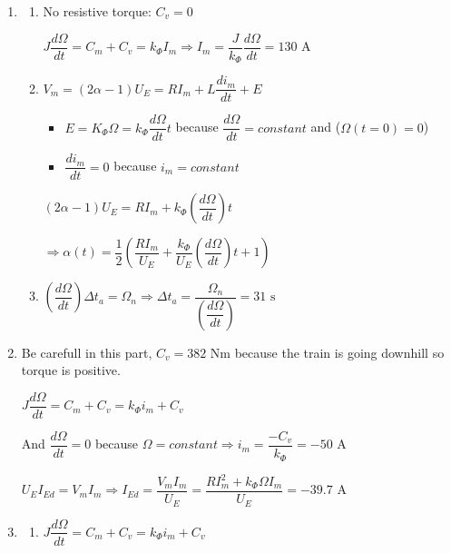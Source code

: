 \begin{enumerate}
\begin{enumerate}
        (1.1) $\Rightarrow V_m = - R \dfrac{C_v}{k_\Phi} \Rightarrow \alpha_{10} = \left(1 + \dfrac{- C_v R}{k_\Phi U_E} \right) \dfrac{1}{2} \approx 0.503$

        $I_{E0} = (2\alpha_{10} - 1) I_m = (2 \alpha_{10} - 1) \dfrac{-C_v}{k_\Phi} = \dfrac{R C_v^2}{k_\Phi^2 U_E} \approx 0.33 \text{ A}$
        
        \item 
        \begin{enumerate}
            \item No resistive torque: $C_v = 0$
        
            $J \dfrac{d\Omega}{dt} = C_m + C_v = k_\Phi I_m \Rightarrow I_m = \dfrac{J}{k_\Phi} \dfrac{d\Omega}{dt} = 130 \text{ A}$

        
            \item $V_m = (2\alpha -1) U_E = R I_m + L \dfrac{di_m}{dt} + E$
            \begin{itemize}
                \item $E = K_\Phi \Omega = k_\Phi \dfrac{d\Omega}{dt} t$ because $\dfrac{d\Omega}{dt} = constant$ and ($\Omega (t=0)=0$)
                \item $\dfrac{di_m}{dt} = 0$ because $i_m = constant$ 
            \end{itemize}
            $(2\alpha -1) U_E = R I_m + k_\Phi \left(\dfrac{d\Omega}{dt}\right) t$

            $\Rightarrow \alpha (t) = \dfrac{1}{2}\left(\dfrac{R I_m}{U_E} + \dfrac{k_\Phi}{U_E} \left(\dfrac{d\Omega}{dt}\right) t + 1\right)$

            \item $\left(\dfrac{d\Omega}{dt}\right) \Delta t_a = \Omega_n \Rightarrow \Delta t_a = \dfrac{\Omega_n}{\left(\dfrac{d\Omega}{dt}\right)} = 31 \text{ s}$
        \end{enumerate}
        \item Be carefull in this part, $C_v = 382 \text{ Nm}$ because the train is going downhill so torque is positive.
        
        $J \dfrac{d\Omega}{dt} = C_m + C_v = k_\Phi i_m + C_v$

        And $\dfrac{d\Omega}{dt} = 0$ because $\Omega = constant \Rightarrow i_m = \dfrac{-C_v}{k_\Phi} = -50 \text{ A}$

        $U_E I_{Ed} = V_m I_m \Rightarrow I_{Ed}= \dfrac{V_m I_m}{U_E} = \dfrac{R I_m^2 + k_\Phi \Omega I_m}{U_E} = -39.7 \text{ A}$

        \item \begin{enumerate}
            \item $J \dfrac{d\Omega}{dt} = C_m + C_v = k_\Phi i_m + C_v$
            

\end{enumerate}
\end{enumerate}
\end{enumerate}
